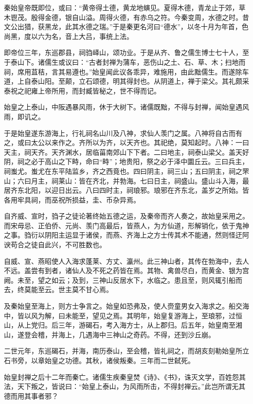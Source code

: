 \documentclass[]{article}
\begin{document}
秦始皇帝既即位，或曰：``黄帝得土德，黄龙地螾见。夏得木德，青龙止于郊，草木鬯茂。殷得金德，银自山溢。周得火德，有赤乌之符。今秦变周，水德之时。昔文公出猎，获黑龙，此其水德之瑞。''于是秦更名河曰``德水''，以冬十月为年首，色尚黑，度以六为名，音上大吕，事统上法。

即帝位三年，东巡郡县，祠驺峄山，颂功业。于是从齐、鲁之儒生博士七十人，至于泰山下。诸儒生或议曰：``古者封禅为蒲车，恶伤山之土、石、草、木；扫地而祠，席用苴秸，言其易遵也。''始皇闻此议各乖异，难施用，由此黜儒生。而遂除车道，上自泰山阳。至颠，立石颂德，明其得封也。从阴道上，禅于梁父。其礼颇采泰祝之祀雍上帝所用，而封臧皆秘之，世不得而记。

始皇之上泰山，中阪遇暴风雨，休于大树下。诸儒既黜，不得与封禅，闻始皇遇风雨，即讥之。

于是始皇遂东游海上，行礼祠名山川及八神，求仙人羡门之属。八神将自古而有之，或曰太公以来作之。齐所以为齐，以天齐也。其祀绝，莫知起时。八神：一曰天主，祠天齐。天齐渊水，居临菑南郊山下下者。二曰地主，祠泰山梁父。盖天好阴，祠之必于高山之下畤，命曰``畤''；地贵阳，祭之必于泽中圜丘云。三曰兵主，祠蚩尤。蚩尤在东平陆监乡，齐之西竟也。四曰阴主，祠三山；五曰阴主，祠之罘山；六曰月主，祠莱山：皆在齐北，并勃海。七曰日主，祠盛山。盛山斗入海，最居齐东北阳，以迎日出云。八曰四时主，祠琅邪。琅邪在齐东北，盖岁之所始。皆各用牢具祠，而巫祝所损益，圭、币杂异焉。

自齐威、宣时，驺子之徒论著终始五德之运，及秦帝而齐人奏之，故始皇采用之。而宋毋忌、正伯侨、元尚、羡门高最后，皆燕人，为方仙道，形解销化，依于鬼神之事。驺衍以阴阳主运显于诸侯，而燕、齐海上之方士传其术不能通，然则怪迂阿谀苟合之徒自此兴，不可胜数也。

自威、宣、燕昭使人入海求蓬莱、方丈、瀛州。此三神山者，其传在勃海中，去人不远。盖尝有到者，诸仙人及不死之药皆在焉。其物、禽兽尽白，而黄金、银为宫阙。未至，望之如云；及到，三神山反居水下，水临之。患且至，则风辄引船而去，终莫能至云。世主莫不甘心焉。

及秦始皇至海上，则方士争言之。始皇如恐弗及，使人赍童男女入海求之。船交海中，皆以风为解，曰未能至，望见之焉。其明年，始皇复游海上，至琅邪，过恒山，从上党归。后三年，游碣石，考入海方士，从上郡归。后五年，始皇南至湘山，遂登会稽，并海上，几遇海中三神山之奇药。不得，还到沙丘崩。

二世元年，东巡碣石，并海，南历泰山，至会稽，皆礼祠之，而胡亥刻勒始皇所立石书旁，以章始皇之功德。其秋，诸侯叛秦。三年而二世弑死。

始皇封禅之后十二年而秦亡。诸儒生疾秦皇焚《诗》、《书》，诛灭文学，百姓怨其法，天下叛之，皆说曰：``始皇上泰山，为风雨所击，不得封禅云。''此岂所谓无其德而用其事者邪？
\end{document}
